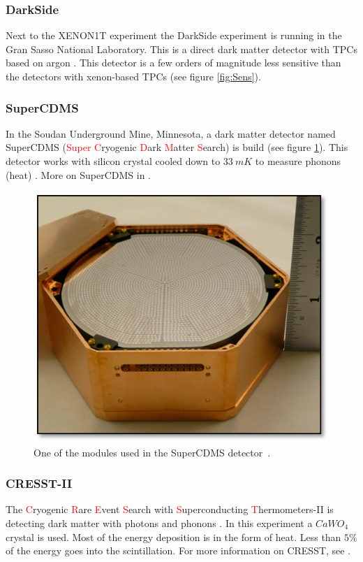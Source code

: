 \documentclass{article}
\begin{document}
\subsubsection{DarkSide}
\label{sec:DarkSide}Next to the XENON1T experiment the DarkSide experiment is running in the Gran Sasso National Laboratory. This is a direct dark matter detector with TPCs based on argon \cite{Agnes:2015ftt, Agnes:2018mon, Edkins:2017qct}. This detector is a few orders of magnitude less sensitive than the detectors with xenon-based TPCs (see figure \ref{fig:Sens}).

\subsubsection{SuperCDMS}
\label{sec:SuperCDMS}In the Soudan Underground Mine, Minnesota, a dark matter detector named SuperCDMS (\textcolor{red}{Super} \textcolor{red}{C}ryogenic \textcolor{red}{D}ark \textcolor{red}{M}atter \textcolor{red}{S}earch) is build (see figure \ref{fig:SuperCDMS}). This detector works with silicon crystal cooled down to $33\ mK$ to measure phonons (heat) \cite{Agnese:2018col}. More on SuperCDMS in \cite{Agnese:2013jaa, Agnese:2014aze, Agnese:2015nto}.

\begin{figure}
    \centering
    \includegraphics[width=.9\textwidth]{SuperCDMS.png}
    \caption{One of the modules used in the SuperCDMS detector~\cite{SuperCDMSphoto}.}
    \label{fig:SuperCDMS}
\end{figure}

\subsubsection{CRESST-II}
\label{sec:CRESST} The \textcolor{red}{C}ryogenic \textcolor{red}{R}are \textcolor{red}{E}vent \textcolor{red}{S}earch with \textcolor{red}{S}uperconducting \textcolor{red}{T}hermometers-II is detecting dark matter with photons and phonons \cite{Angloher:2015ewa}. In this experiment a $CaWO_4$ crystal is used. Most of the energy deposition is in the form of heat. Less than $5\%$ of the energy goes into the scintillation. For more information on CRESST, see \cite{Bravin:1999fc,Angloher:2014myn,Petricca:2017zdp}.
\end{document}
